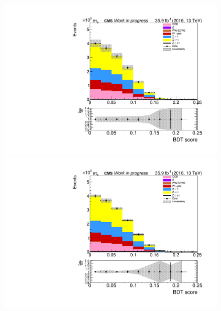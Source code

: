 \begin{figure}[htp]
	\begin{multicols}{2}
		\includegraphics[width=\linewidth]{plots/et/ZeroJet_prefit.pdf}\par 
		\includegraphics[width=\linewidth]{plots/et/ZeroJet_postfit.pdf}\par
	\end{multicols}	


\end{figure}
